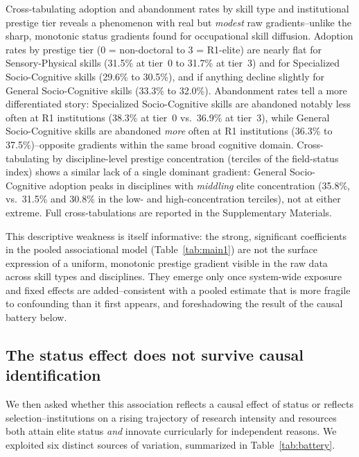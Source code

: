 \documentclass[11pt, letterpaper]{article}
\begin{document}
Cross-tabulating adoption and abandonment rates by skill type and institutional prestige tier reveals a phenomenon with real but \emph{modest} raw gradients--unlike the sharp, monotonic status gradients found for occupational skill diffusion. Adoption rates by prestige tier (0 = non-doctoral to 3 = R1-elite) are nearly flat for Sensory-Physical skills (31.5\% at tier~0 to 31.7\% at tier~3) and for Specialized Socio-Cognitive skills (29.6\% to 30.5\%), and if anything decline slightly for General Socio-Cognitive skills (33.3\% to 32.0\%). Abandonment rates tell a more differentiated story: Specialized Socio-Cognitive skills are abandoned notably less often at R1 institutions (38.3\% at tier~0 vs.\ 36.9\% at tier~3), while General Socio-Cognitive skills are abandoned \emph{more} often at R1 institutions (36.3\% to 37.5\%)--opposite gradients within the same broad cognitive domain. Cross-tabulating by discipline-level prestige concentration (terciles of the field-status index) shows a similar lack of a single dominant gradient: General Socio-Cognitive adoption peaks in disciplines with \emph{middling} elite concentration (35.8\%, vs.\ 31.5\% and 30.8\% in the low- and high-concentration terciles), not at either extreme. Full cross-tabulations are reported in the Supplementary Materials.

This descriptive weakness is itself informative: the strong, significant coefficients in the pooled associational model (Table~\ref{tab:main1}) are not the surface expression of a uniform, monotonic prestige gradient visible in the raw data across skill types and disciplines. They emerge only once system-wide exposure and fixed effects are added--consistent with a pooled estimate that is more fragile to confounding than it first appears, and foreshadowing the result of the causal battery below.

\subsection*{The status effect does not survive causal identification}

We then asked whether this association reflects a causal effect of status or reflects selection--institutions on a rising trajectory of research intensity and resources both attain elite status \emph{and} innovate curricularly for independent reasons. We exploited six distinct sources of variation, summarized in Table~\ref{tab:battery}.
\end{document}
